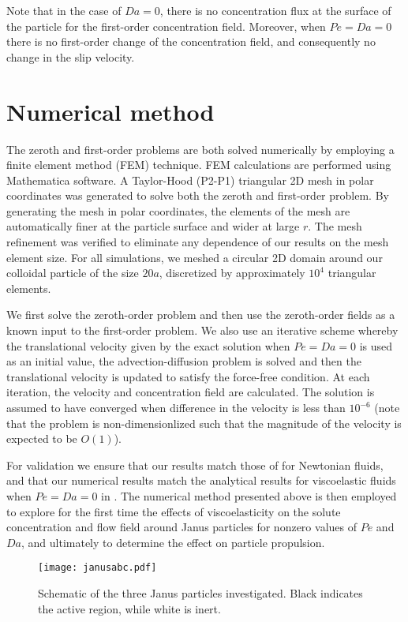 \documentclass[aps,pre,reprint,twocolumn,notitlepage,superscriptaddress]{revtex4-1}
\begin{document}
Note that in the case of $Da=0$, there is no concentration flux at the surface of the particle for the first-order concentration field. Moreover, when $Pe=Da=0$ there is no first-order change of the concentration field, and consequently no change in the slip velocity.

\section{Numerical method}

The zeroth and first-order problems are both solved numerically by employing a finite element method (FEM) technique. FEM calculations are performed using Mathematica software.  A Taylor-Hood (P2-P1) triangular 2D mesh in polar coordinates was generated to solve both the zeroth and first-order problem. By generating the mesh in polar coordinates, the elements of the mesh are automatically finer at the particle surface and wider at large $r$. The mesh refinement was verified to eliminate any dependence of our results on the mesh element size. For all simulations, we meshed a circular 2D domain around our colloidal particle of the size $20a$, discretized by approximately $10^4$ triangular elements.


We first solve the zeroth-order problem and then use the zeroth-order fields as a known input to the first-order problem. We also use an iterative scheme whereby the translational velocity given by the exact solution when $Pe=Da=0$ is used as an initial value, the advection-diffusion problem is solved and then the translational velocity is updated to satisfy the force-free condition. At each iteration, the velocity and concentration field are calculated. The solution is assumed to have converged when difference in the velocity is less than $10^{-6}$ (note that the problem is non-dimensionlized such that the magnitude of the velocity is expected to be $O(1)$).

For validation we ensure that our results match those of \citet{michelin14} for Newtonian fluids, and that our numerical results match the analytical results for viscoelastic fluids when $Pe=Da=0$ in \citet{datt2017active}. The numerical method presented above is then employed to explore for the first time the effects of viscoelasticity on the solute concentration and flow field around Janus particles for nonzero values of $Pe$ and $Da$, and ultimately to determine the effect on particle propulsion.

\begin{figure}[t!]
\centering
        \texttt{[image: janusabc.pdf]}
        \caption{Schematic of the three Janus particles investigated. Black indicates the active region, while white is inert.}
		\label{JanusABC}
\end{figure}
\end{document}
